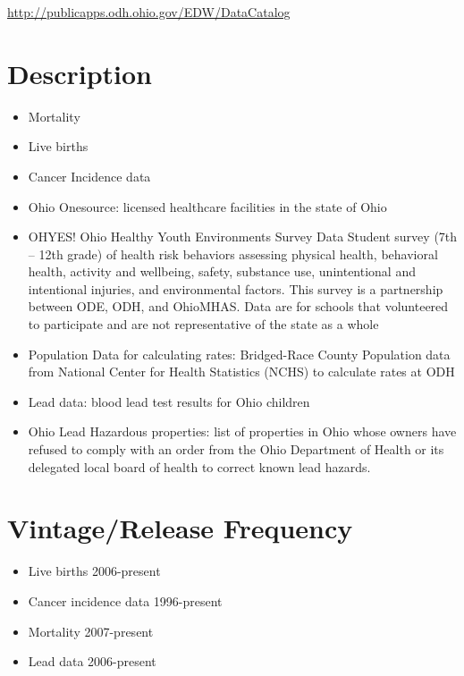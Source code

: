 \documentclass[
]{book}
\providecommand{\tightlist}{%
  \setlength{\itemsep}{0pt}\setlength{\parskip}{0pt}}
\begin{document}
\url{http://publicapps.odh.ohio.gov/EDW/DataCatalog}

\hypertarget{description-85}{%
\section{Description}\label{description-85}}

\begin{itemize}
\tightlist
\item
  Mortality
\item
  Live births
\item
  Cancer Incidence data
\item
  Ohio Onesource: licensed healthcare facilities in the state of Ohio
\item
  OHYES! Ohio Healthy Youth Environments Survey Data Student survey (7th -- 12th grade) of health risk behaviors assessing physical health, behavioral health, activity and wellbeing, safety, substance use, unintentional and intentional injuries, and environmental factors. This survey is a partnership between ODE, ODH, and OhioMHAS. Data are for schools that volunteered to participate and are not representative of the state as a whole
\item
  Population Data for calculating rates: Bridged-Race County Population data from National Center for Health Statistics (NCHS) to calculate rates at ODH
\item
  Lead data: blood lead test results for Ohio children
\item
  Ohio Lead Hazardous properties: list of properties in Ohio whose owners have refused to comply with an order from the Ohio Department of Health or its delegated local board of health to correct known lead hazards.
\end{itemize}

\hypertarget{vintagerelease-frequency-85}{%
\section{Vintage/Release Frequency}\label{vintagerelease-frequency-85}}

\begin{itemize}
\tightlist
\item
  Live births 2006-present
\item
  Cancer incidence data 1996-present
\item
  Mortality 2007-present
\item
  Lead data 2006-present
\end{itemize}
\end{document}
